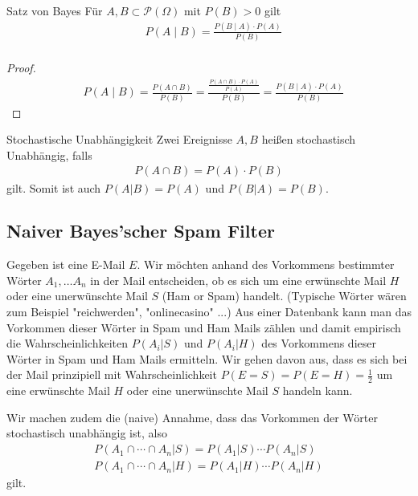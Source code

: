 \begin{Satz}{Satz von Bayes}
Für $A,B \subset \mathcal{P}(\Omega)$ mit  $P(B) > 0$ gilt
\begin{align*}
& P(A \; | \;  B) = \frac{P(B \; | \; A) \cdot P(A)} {P(B)} \\
\end{align*}
\end{Satz}

\begin{proof}
\begin{align*}
& P(A \; | \;  B) =\frac{P(A \cap B)}{P(B)} = \frac{ \frac{P(A \cap B) \cdot P(A)}{P(A)}}{P(B)}  =  \frac{P(B \; | \; A) \cdot P(A)} {P(B)} 
\end{align*}
\end{proof}


\begin{Definition}{Stochastische Unabhängigkeit}
Zwei Ereignisse $A,B$ heißen stochastisch Unabhängig, falls
\begin{align*}
P(A \cap B) = P(A) \cdot P(B)
\end{align*}
gilt.  Somit ist auch $P(A | B) = P(A)$ und $P(B  | A) = P(B)$.
\end{Definition}


\subsection{Naiver Bayes'scher Spam Filter}
Gegeben ist eine E-Mail $E$.  Wir möchten anhand des Vorkommens bestimmter Wörter $A_1, \ldots A_n$ in der Mail entscheiden, ob es sich um eine erwünschte Mail $H$ oder eine unerwünschte Mail $S$ (Ham or Spam) handelt. 
(Typische Wörter wären zum Beispiel "reichwerden",  "onlinecasino" ...)
Aus einer Datenbank kann man das Vorkommen dieser Wörter in Spam und Ham Mails zählen und damit empirisch die Wahrscheinlichkeiten $P(A_i | S)$ und $P(A_i | H) $ des Vorkommens dieser Wörter in Spam und Ham Mails ermitteln.  Wir gehen davon aus, dass es sich bei der Mail  prinzipiell mit  Wahrscheinlichkeit $P(E= S) = P(E= H)= \frac{1}{2}$  um eine erwünschte  Mail $H$ oder eine unerwünschte Mail $S$  handeln kann. 




 Wir machen zudem die (naive) Annahme, dass das Vorkommen der Wörter  stochastisch unabhängig ist, also 
\begin{align*}
P(A_1 \cap \cdots \cap A_n | S) = P(A_1 | S) \cdots P(A_n | S) \\
P(A_1 \cap \cdots \cap A_n | H) = P(A_1 | H) \cdots P(A_n | H)
\end{align*}
gilt.


